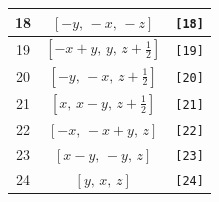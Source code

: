 \documentclass[fleqn,8pt]{jsarticle}
\begin{document}
\begin{longtable}{ccc}
18 & $\left[ - y,\, - x,\, - z \right]$ & {\tt [18]} \\ \hline
19 & $\left[ - x + y,\, y,\, z + \frac{1}{2} \right]$ & {\tt [19]} \\ \hline
20 & $\left[ - y,\, - x,\, z + \frac{1}{2} \right]$ & {\tt [20]} \\ \hline
21 & $\left[ x,\, x - y,\, z + \frac{1}{2} \right]$ & {\tt [21]} \\ \hline
22 & $\left[ - x,\, - x + y,\, z \right]$ & {\tt [22]} \\ \hline
23 & $\left[ x - y,\, - y,\, z \right]$ & {\tt [23]} \\ \hline
24 & $\left[ y,\, x,\, z \right]$ & {\tt [24]} \\
\end{longtable}
\end{document}
